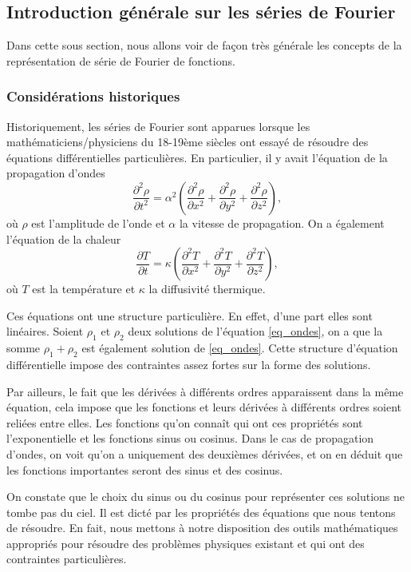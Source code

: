 \documentclass[a4paper,12pt]{book}
\newcommand{\pDeriv}[2]{\frac{\partial #1}{\partial #2}}
\newcommand{\pDerivTwo}[2]{\frac{\partial^2 #1}{\partial #2^2}}
\renewcommand{\eqref}[1]{\ref{#1}}
\begin{document}
\subsection{Introduction générale sur les séries de Fourier}

Dans cette sous section, nous allons voir de façon très générale les concepts 
de la représentation de série de Fourier de fonctions.

\subsubsection{Considérations historiques}

Historiquement, les séries de Fourier sont apparues lorsque les mathématiciens/physiciens 
du 18-19ème siècles ont essayé de résoudre des équations différentielles particulières. 
En particulier, il y avait l'équation de la propagation d'ondes
\begin{equation}
 \pDerivTwo{\rho}{t}=\alpha^2\left(\pDerivTwo{\rho}{x}+\pDerivTwo{\rho}{y}+\pDerivTwo{\rho}{z}\right),\label{eq_ondes}
\end{equation}
où $\rho$ est l'amplitude de l'onde et $\alpha$ la vitesse de propagation.
On a également l'équation de la chaleur 
\begin{equation}
 \pDeriv{T}{t}=\kappa\left(\pDerivTwo{T}{x}+\pDerivTwo{T}{y}+\pDerivTwo{T}{z}\right),
\end{equation}
où $T$ est la température et $\kappa$ la diffusivité thermique.

Ces équations ont une structure particulière. En effet, d'une part elles sont linéaires. Soient $\rho_1$ et $\rho_2$
deux solutions de l'équation \eqref{eq_ondes}, on a que la somme $\rho_1+\rho_2$ est également solution de \eqref{eq_ondes}.
Cette structure d'équation différentielle impose des contraintes assez fortes sur la forme des solutions.

Par ailleurs, le fait que les dérivées à différents ordres apparaissent dans la même équation, cela impose 
que les fonctions et leurs dérivées à différents ordres soient reliées entre elles. Les fonctions qu'on connaît
qui ont ces propriétés sont l'exponentielle et les fonctions sinus ou cosinus.
Dans le cas de propagation d'ondes, on voit qu'on a uniquement des deuxièmes dérivées, et on en déduit
que les fonctions importantes seront des sinus et des cosinus.

On constate que le choix du sinus ou du cosinus pour représenter ces solutions ne tombe pas du ciel.
Il est dicté par les propriétés des équations que nous tentons de résoudre. En fait, nous mettons à 
notre disposition des outils mathématiques appropriés pour résoudre des problèmes physiques
existant et qui ont des contraintes particulières.
\end{document}
